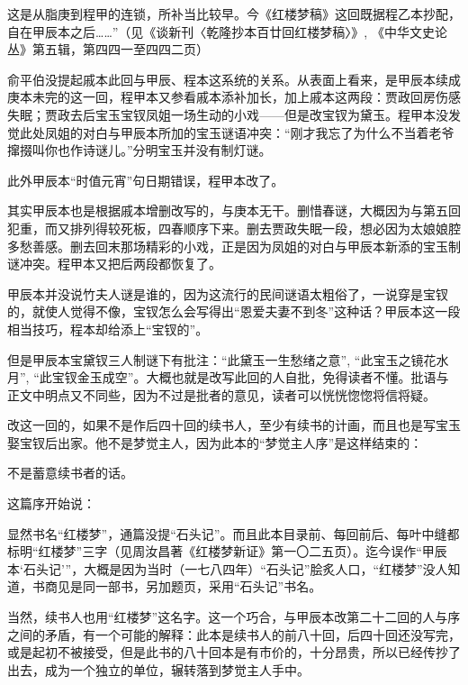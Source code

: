\par 这是从脂庚到程甲的连锁，所补当比较早。今《红楼梦稿》这回既据程乙本抄配，自在甲辰本之后……”（见《谈新刊〈乾隆抄本百廿回红楼梦稿〉》, 《中华文史论丛》第五辑，第四四一至四四二页）
\par 俞平伯没提起戚本此回与甲辰、程本这系统的关系。从表面上看来，是甲辰本续成庚本未完的这一回，程甲本又参看戚本添补加长，加上戚本这两段：贾政回房伤感失眠；贾政去后宝玉宝钗凤姐一场生动的小戏——但是改宝钗为黛玉。程甲本没发觉此处凤姐的对白与甲辰本所加的宝玉谜语冲突：“刚才我忘了为什么不当着老爷撺掇叫你也作诗谜儿。”分明宝玉并没有制灯谜。
\par 此外甲辰本“时值元宵”句日期错误，程甲本改了。
\par 其实甲辰本也是根据戚本增删改写的，与庚本无干。删惜春谜，大概因为与第五回犯重，而又排列得较死板，四春顺序下来。删去贾政失眠一段，想必因为太娘娘腔多愁善感。删去回末那场精彩的小戏，正是因为凤姐的对白与甲辰本新添的宝玉制谜冲突。程甲本又把后两段都恢复了。
\par 甲辰本并没说竹夫人谜是谁的，因为这流行的民间谜语太粗俗了，一说穿是宝钗的，就使人觉得不像，宝钗怎么会写得出“恩爱夫妻不到冬”这种话？甲辰本这一段相当技巧，程本却给添上“宝钗的”。
\par 但是甲辰本宝黛钗三人制谜下有批注：“此黛玉一生愁绪之意”, “此宝玉之镜花水月”, “此宝钗金玉成空”。大概也就是改写此回的人自批，免得读者不懂。批语与正文中明点又不同些，因为不过是批者的意见，读者可以恍恍惚惚将信将疑。
\par 改这一回的，如果不是作后四十回的续书人，至少有续书的计画，而且也是写宝玉娶宝钗后出家。他不是梦觉主人，因为此本的“梦觉主人序”是这样结束的：
\par 不是蓄意续书者的话。
\par 这篇序开始说：
\par 显然书名“红楼梦”，通篇没提“石头记”。而且此本目录前、每回前后、每叶中缝都标明“红楼梦”三字（见周汝昌著《红楼梦新证》第一〇二五页）。迄今误作“甲辰本‘石头记’”，大概是因为当时（一七八四年）“石头记”脍炙人口，“红楼梦”没人知道，书商见是同一部书，另加题页，采用“石头记”书名。
\par 当然，续书人也用“红楼梦”这名字。这一个巧合，与甲辰本改第二十二回的人与序之间的矛盾，有一个可能的解释：此本是续书人的前八十回，后四十回还没写完，或是起初不被接受，但是此书的八十回本是有市价的，十分昂贵，所以已经传抄了出去，成为一个独立的单位，辗转落到梦觉主人手中。
